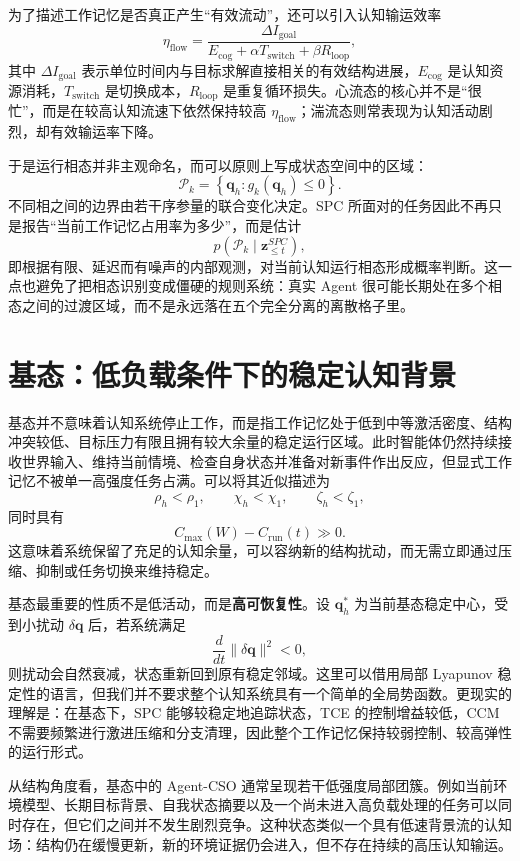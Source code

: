 为了描述工作记忆是否真正产生“有效流动”，还可以引入认知输运效率
\[
\eta_{\mathrm{flow}}
=
\frac{
\Delta I_{\mathrm{goal}}
}{
E_{\mathrm{cog}}+\alpha T_{\mathrm{switch}}+\beta R_{\mathrm{loop}}
},
\]
其中 $\Delta I_{\mathrm{goal}}$ 表示单位时间内与目标求解直接相关的有效结构进展，$E_{\mathrm{cog}}$ 是认知资源消耗，$T_{\mathrm{switch}}$ 是切换成本，$R_{\mathrm{loop}}$ 是重复循环损失。心流态的核心并不是“很忙”，而是在较高认知流速下依然保持较高 $\eta_{\mathrm{flow}}$；湍流态则常表现为认知活动剧烈，却有效输运率下降。

于是运行相态并非主观命名，而可以原则上写成状态空间中的区域：
\[
\mathcal P_k
=
\left\{
\mathbf q_h:
g_k(\mathbf q_h)\leq 0
\right\}.
\]
不同相之间的边界由若干序参量的联合变化决定。SPC 所面对的任务因此不再只是报告“当前工作记忆占用率为多少”，而是估计
\[
p(
\mathcal P_k
\mid
\mathbf z_{\leq t}^{SPC}
),
\]
即根据有限、延迟而有噪声的内部观测，对当前认知运行相态形成概率判断。这一点也避免了把相态识别变成僵硬的规则系统：真实 Agent 很可能长期处在多个相态之间的过渡区域，而不是永远落在五个完全分离的离散格子里。

\section{基态：低负载条件下的稳定认知背景}

基态并不意味着认知系统停止工作，而是指工作记忆处于低到中等激活密度、结构冲突较低、目标压力有限且拥有较大余量的稳定运行区域。此时智能体仍然持续接收世界输入、维持当前情境、检查自身状态并准备对新事件作出反应，但显式工作记忆不被单一高强度任务占满。可以将其近似描述为
\[
\rho_h<\rho_1,\qquad
\chi_h<\chi_1,\qquad
\zeta_h<\zeta_1,
\]
同时具有
\[
C_{\max}(W)-C_{\mathrm{run}}(t)
\gg 0.
\]
这意味着系统保留了充足的认知余量，可以容纳新的结构扰动，而无需立即通过压缩、抑制或任务切换来维持稳定。

基态最重要的性质不是低活动，而是\textbf{高可恢复性}。设 $\mathbf q_h^\ast$ 为当前基态稳定中心，受到小扰动 $\delta\mathbf q$ 后，若系统满足
\[
\frac{d}{dt}
\|\delta\mathbf q\|^2<0,
\]
则扰动会自然衰减，状态重新回到原有稳定邻域。这里可以借用局部 Lyapunov 稳定性的语言，但我们并不要求整个认知系统具有一个简单的全局势函数。更现实的理解是：在基态下，SPC 能够较稳定地追踪状态，TCE 的控制增益较低，CCM 不需要频繁进行激进压缩和分支清理，因此整个工作记忆保持较弱控制、较高弹性的运行形式。

从结构角度看，基态中的 Agent-CSO 通常呈现若干低强度局部团簇。例如当前环境模型、长期目标背景、自我状态摘要以及一个尚未进入高负载处理的任务可以同时存在，但它们之间并不发生剧烈竞争。这种状态类似一个具有低速背景流的认知场：结构仍在缓慢更新，新的环境证据仍会进入，但不存在持续的高压认知输运。

